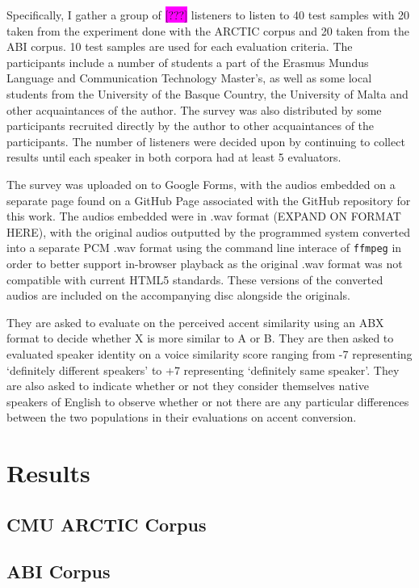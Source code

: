 \documentclass
[
    a4paper,
    twoside,
    12pt,
]
{report}
\begin{document}
Specifically, I gather a group of \colorbox{magenta}{[???]} listeners to
listen to 40 test samples with 20 taken from the experiment done with
the ARCTIC corpus and 20 taken from the ABI corpus. 10 test samples are
used for each evaluation criteria. The participants include a number of
students a part of the Erasmus Mundus Language and Communication
Technology Master's, as well as some local students from the University
of the Basque Country, the University of Malta and other acquaintances
of the author. The survey was also distributed by some participants
recruited directly by the author to other acquaintances of the
participants. The number of listeners were decided upon by continuing to
collect results until each speaker in both corpora had at least 5
evaluators.

The survey was uploaded on to Google Forms, with the audios embedded on
a separate page found on a GitHub Page associated with the GitHub
repository for this work. The audios embedded were in .wav format
(EXPAND ON FORMAT HERE), with the original audios outputted by the
programmed system converted into a separate PCM .wav format using the
command line interace of \texttt{ffmpeg} in order to better support
in-browser playback as the original .wav format was not compatible with
current HTML5 standards. These versions of the converted audios are
included on the accompanying disc alongside the originals.

They are asked to evaluate on the perceived accent similarity using an
ABX format to decide whether X is more similar to A or B. They are then
asked to evaluated speaker identity on a voice similarity score ranging
from -7 representing `definitely different speakers' to +7 representing
`definitely same speaker'. They are also asked to indicate whether or
not they consider themselves native speakers of English to observe
whether or not there are any particular differences between the two
populations in their evaluations on accent conversion.

\hypertarget{results}{%
\section{Results}\label{results}}

\hypertarget{cmu-arctic-corpus}{%
\subsection{CMU ARCTIC Corpus}\label{cmu-arctic-corpus}}

\hypertarget{abi-corpus}{%
\subsection{ABI Corpus}\label{abi-corpus}}
\cleardoublepage
% 
% 

\printbibliography
\end{document}
